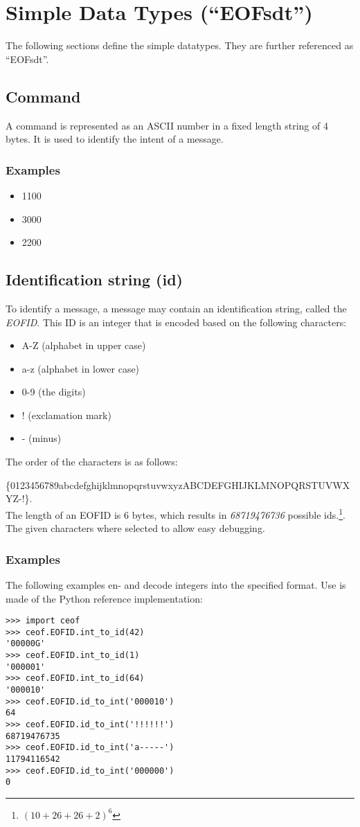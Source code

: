 \section{Simple Data Types ("`EOFsdt"')}
The following sections define the simple datatypes.
They are further referenced as "`EOFsdt"'.
\subsection{Command}
A command is represented as an ASCII number in a fixed length string of
4 bytes. It is used to identify the intent of a message.
\subsubsection{Examples}
\begin{itemize}
\item 1100
\item 3000
\item 2200
\end{itemize}
\subsection{Identification string (id)}
\label{eofid}
To identify a message, a message may contain an identification string,
called the \textit{EOFID}.
This ID is an integer that is encoded based on the following characters:
\begin{itemize}
\item A-Z (alphabet in upper case)
\item a-z (alphabet in lower case)
\item 0-9 (the digits)
\item ! (exclamation mark)
\item - (minus)
\end{itemize}
The order of the characters is as follows:

\small{\{0123456789abcdefghijklmnopqrstuvwxyzABCDEFGHIJKLMNOPQRSTUVWXYZ-!\}}.\\
The length of an EOFID is 6 bytes, which results in
\emph{68719476736} possible ids.\footnote{$(10+26+26+2)^6$}.
The given characters where selected to allow easy debugging.
\subsubsection{Examples}
The following examples en- and decode integers into the specified format.
Use is made of the Python reference implementation:
\begin{verbatim}
>>> import ceof
>>> ceof.EOFID.int_to_id(42)
'00000G'
>>> ceof.EOFID.int_to_id(1)
'000001'
>>> ceof.EOFID.int_to_id(64)
'000010'
>>> ceof.EOFID.id_to_int('000010')
64
>>> ceof.EOFID.id_to_int('!!!!!!')
68719476735
>>> ceof.EOFID.id_to_int('a-----')
11794116542
>>> ceof.EOFID.id_to_int('000000')
0
\end{verbatim}
